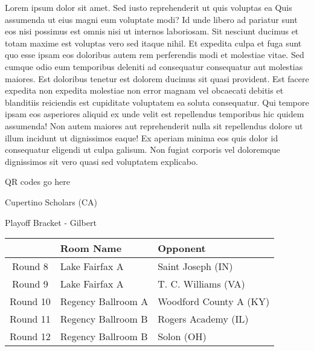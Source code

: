 \documentclass{article}%
\begin{document}
\vspace*{8pt}%
\linebreak%
\newline%
\newline%
Lorem ipsum dolor sit amet. Sed iusto reprehenderit ut quis voluptas ea Quis assumenda ut eius magni eum voluptate modi? Id unde libero ad pariatur sunt eos nisi possimus est omnis nisi ut internos laboriosam. Sit nesciunt ducimus et totam maxime est voluptas vero sed itaque nihil. Et expedita culpa et fuga sunt quo esse ipsam eos doloribus autem rem perferendis modi et molestiae vitae.\newline%
\newline%
Sed cumque odio eum temporibus deleniti ad consequatur consequatur aut molestias maiores. Est doloribus tenetur est dolorem ducimus sit quasi provident. Est facere expedita non expedita molestiae non error magnam vel obcaecati debitis et blanditiis reiciendis est cupiditate voluptatem ea soluta consequatur. Qui tempore ipsam eos asperiores aliquid ex unde velit est repellendus temporibus hic quidem assumenda!\newline%
\newline%
Non autem maiores aut reprehenderit nulla sit repellendus dolore ut illum incidunt ut dignissimos eaque! Ex aperiam minima eos quis dolor id consequatur eligendi ut culpa galisum. Non fugiat corporis vel doloremque dignissimos sit vero quasi sed voluptatem explicabo.\newline%
\newline%
%
\vspace*{30pt}%
\begin{center}%
\begin{Huge}%
QR codes go here%
\end{Huge}%
\end{center}%
\newpage%
\begin{center}%
\begin{Huge}%
Cupertino Scholars (CA)%
\end{Huge}%
\vspace*{8pt}%
\linebreak%
\begin{Large}%
Playoff Bracket {-} Gilbert%
\end{Large}%
\end{center}%
%
\begin{tabularx}{\textwidth}{|c|Y|Y|}%
\hline%
&Room Name&Opponent\\%
\hline%
Round 8&Lake Fairfax A&Saint Joseph (IN)\\%
Round 9&Lake Fairfax A&T. C. Williams (VA)\\%
Round 10&Regency Ballroom A&Woodford County A (KY)\\%
Round 11&Regency Ballroom B&Rogers Academy (IL)\\%
Round 12&Regency Ballroom B&Solon (OH)\\%
\hline%
\end{tabularx}%
\end{document}
